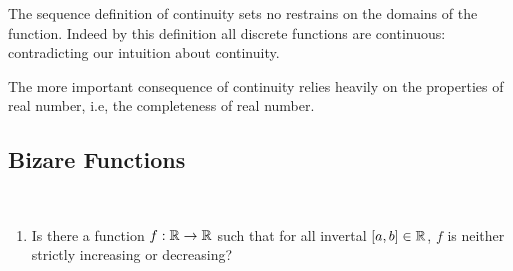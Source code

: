 \documentclass[../note.tex]{subfiles}
\begin{document}
\begin{remark}
	The sequence definition of continuity sets no restrains on the domains of the function. Indeed by this definition all discrete functions are continuous: contradicting our intuition about continuity.
	
	The more important consequence of continuity relies heavily on the properties of real number, i.e, the completeness of real number.
\end{remark}

\subsection{Bizare Functions}
\begin{hypothesis}
	\ 
\begin{enumerate}
	\item Is there a function $f: \mathbb{R} \rightarrow \mathbb{R}$ such that for all invertal $[a,b] \in \mathbb{R}$, $f$ is neither strictly increasing or decreasing? 
\end{enumerate}
\end{hypothesis}
\end{document}

